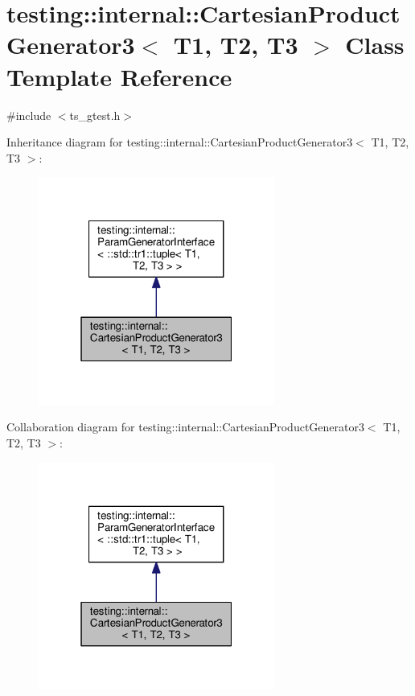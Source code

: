 \hypertarget{classtesting_1_1internal_1_1CartesianProductGenerator3}{\section{testing\-:\-:internal\-:\-:Cartesian\-Product\-Generator3$<$ T1, T2, T3 $>$ Class Template Reference}
\label{classtesting_1_1internal_1_1CartesianProductGenerator3}
}


{\ttfamily \#include $<$ts\-\_\-gtest.\-h$>$}



Inheritance diagram for testing\-:\-:internal\-:\-:Cartesian\-Product\-Generator3$<$ T1, T2, T3 $>$\-:\nopagebreak
\begin{figure}[H]
\begin{center}
\leavevmode
\includegraphics[width=220pt]{classtesting_1_1internal_1_1CartesianProductGenerator3__inherit__graph}
\end{center}
\end{figure}


Collaboration diagram for testing\-:\-:internal\-:\-:Cartesian\-Product\-Generator3$<$ T1, T2, T3 $>$\-:\nopagebreak
\begin{figure}[H]
\begin{center}
\leavevmode
\includegraphics[width=220pt]{classtesting_1_1internal_1_1CartesianProductGenerator3__coll__graph}
\end{center}
\end{figure}
